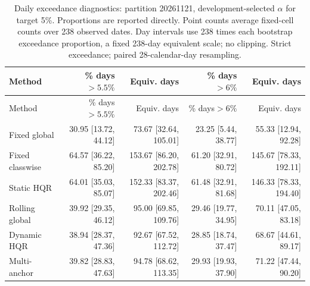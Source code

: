 \begingroup\small\setlength{\tabcolsep}{3pt}
\begin{longtable}{lrrrr}
\caption{Daily exceedance diagnostics: partition 20261121, development-selected $\alpha$ for target 5\%. Proportions are reported directly. Point counts average fixed-cell counts over 238 observed dates. Day intervals use 238 times each bootstrap exceedance proportion, a fixed 238-day equivalent scale; no clipping. Strict exceedance; paired 28-calendar-day resampling.}\label{tab:final-risk-0-1-exceed}\\
\toprule
Method & \% days$>5.5\%$ & Equiv. days & \% days$>6\%$ & Equiv. days\\
\midrule
\endfirsthead
\toprule
Method & \% days$>5.5\%$ & Equiv. days & \% days$>6\%$ & Equiv. days\\
\midrule
\endhead
Fixed global & 30.95 [13.72, 44.12] & 73.67 [32.64, 105.01] & 23.25 [5.44, 38.77] & 55.33 [12.94, 92.28]\\
Fixed classwise & 64.57 [36.22, 85.20] & 153.67 [86.20, 202.78] & 61.20 [32.91, 80.72] & 145.67 [78.33, 192.11]\\
Static HQR & 64.01 [35.03, 85.07] & 152.33 [83.37, 202.46] & 61.48 [32.91, 81.68] & 146.33 [78.33, 194.40]\\
Rolling global & 39.92 [29.35, 46.12] & 95.00 [69.85, 109.76] & 29.46 [19.77, 34.95] & 70.11 [47.05, 83.18]\\
Dynamic HQR & 38.94 [28.37, 47.36] & 92.67 [67.52, 112.72] & 28.85 [18.74, 37.47] & 68.67 [44.61, 89.17]\\
Multi-anchor & 39.82 [28.83, 47.63] & 94.78 [68.62, 113.35] & 29.93 [19.93, 37.90] & 71.22 [47.44, 90.20]\\
\bottomrule
\end{longtable}
\endgroup
